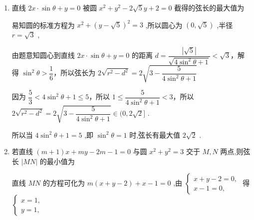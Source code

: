 \begin{enumerate}
    \begin{jieda}
        圆化为标准方程：${\left( x + 1\right) }^{2} + {\left( y - 3\right) }^{2} = 4$，圆心为(-1,3),半径为 $r = 2$
        
        因为 $\left| {AB}\right|  = 2\sqrt{3}$ ,所以圆心到直线的距离为 $d = \sqrt{{2}^{2} - {\left( \sqrt{3}\right) }^{2}} = 1$
        综上,所求直线的方程为 ${3x} + {4y} - 4 = 0$ 或 $x = 0$.
    \end{jieda}
    \item 直线 ${2x} \cdot  \sin \theta  + y = 0$ 被圆 ${x}^{2} + {y}^{2} - 2\sqrt{5}y + 2 = 0$ 截得的弦长的最大值为
    \begin{jieda}
        易知圆的标准方程为 ${x}^{2} + {\left( y - \sqrt{5}\right) }^{2} = 3$ ,所以圆心为 $\left( {0,\sqrt{5}}\right)$ ,半径 $r = \sqrt{3}$ ,
        
        由题意知圆心到直线 ${2x} \cdot  \sin \theta  + y = 0$ 的距离 $d = \dfrac{\left| \sqrt{5}\right| }{\sqrt{4{\sin }^{2}\theta  + 1}} < \sqrt{3}$，解得 ${\sin }^{2}\theta  > \dfrac{1}{6}$，所以弦长为 $2\sqrt{{r}^{2} - {d}^{2}} = 2\sqrt{3 - \dfrac{5}{4{\sin }^{2}\theta  + 1}}$ 
        
        因为 $\dfrac{5}{3} < 4{\sin }^{2}\theta  + 1 \leq  5$，所以 $1 \leq  \dfrac{5}{4{\sin }^{2}\theta  + 1} < 3$，所以 $2\sqrt{{r}^{2} - {d}^{2}} = 2\sqrt{3 - \dfrac{5}{4{\sin }^{2}\theta  + 1}} \in  (0,2\sqrt{2}\rbrack$ .
        
        所以当 $4{\sin }^{2}\theta  + 1 = 5$ ,即 ${\sin }^{2}\theta  = 1$ 时,弦长有最大值 $2\sqrt{2}$ .
    \end{jieda}
    \item 若直线 $\left( {m + 1}\right) x + {my} - {2m} - 1 = 0$ 与圆 ${x}^{2} + {y}^{2} = 3$ 交于 $M,N$ 两点,则弦长 $\left| {MN}\right|$ 的最小值为
    \begin{jieda}
        直线 ${MN}$ 的方程可化为 $m\left( {x + y - 2}\right)  + x - 1 = 0$ ,由 $\left\{  {\begin{array}{l} x + y - 2 = 0, \\  x - 1 = 0, \end{array}}\right.$ 得 $\left\{  \begin{array}{l} x = 1, \\  y = 1, \end{array}\right.$
        

\end{jieda}
\end{enumerate}
